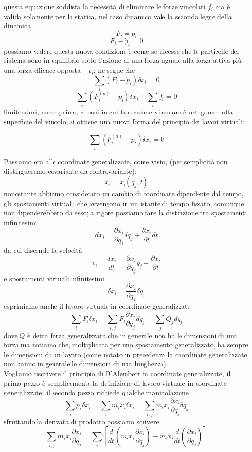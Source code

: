 \documentclass[
10pt, %
a4paper, %
oneside, %
headinclude,footinclude, %
BCOR5mm, %
]{scrartcl}
\begin{document}
questa equazione soddisfa la necessità di eliminare le forze vincolari \(f_i\) ma è valida solamente per la statica, nel caso dinamico vale la seconda legge della dinamica
\[F_i  = \dot{p_i}\]
\[F_i-\dot{p}_i = 0\]
possiamo vedere questa nuova condizione è come se dicesse che le particelle del sistema sono in equilibrio sotto l'azione di una forza uguale alla forza attiva più una forza efficace opposta \(-\dot{p}_i\); ne segue che
\[\sum_i(F_i-\dot{p}_i)\delta x_i = 0\]
\[\sum_i(F^{(a)}_i-\dot{p}_i)\delta x_i + \sum_i f_i = 0\]
limitandoci, come prima, ai casi in cui la reazione vincolare è ortogonale alla superficie del vincolo, si ottiene una nuova forma del principio dei lavori virtuali:
\begin{teorema}
	\[\sum_i(F^{(a)}_i-\dot{p}_i)\delta x_i= 0\]
\end{teorema}
Passiamo ora alle coordinate generalizzate, come visto, (per semplicità non distingueremo covariante da controvariante):
\[ x_i = x_i(q_j, t)\]
nonostante abbiamo considerato un cambio di coordinate dipendente dal tempo, gli spostamenti virtuali, che avvengono in un istante di tempo fissato, comunque non dipenderebbero da esso; a rigore possiamo fare la distinzione tra spostamenti infinitesimi
\[d x_i = \frac{\partial x_i}{\partial q_j}d q_j + \frac{\partial x_i}{\partial t}dt\]
da cui discende la velocità
\[v_i = \frac{dx_i}{dt}= \frac{\partial x_i}{\partial q_j}\dot{q}_j + \frac{\partial x_i}{\partial t}\]
e spostamenti virtuali infinitesimi
\[\delta x_i =  \frac{\partial x_i}{\partial q_j}\delta q_j\]
esprimiamo anche il lavoro virtuale in coordinate generalizzate
\[\sum_i F_i\delta x_i = \sum_{i,j}F_i \frac{\partial x_i}{\partial q_j}d q_j = \sum_j Q_j d q_j\]
dove \(Q\) è detta forza generalizzata che in generale non ha le dimensioni di una forza ma notiamo che, moltiplicata per uno spostamento generalizzato, ha sempre le dimensioni di un lavoro (come notato in precedenza la coordinate generalizzate non hanno in generale le dimensioni di una lunghezza).\\
Vogliamo riscrivere il principio di D'Alembert in coordinate generalizzate, il primo pezzo è semplicemente la definizione di lavoro virtuale in coordinate generalizzate; il secondo pezzo richiede qualche manipolazione
\[\sum_i \dot{p}_i \delta x_i = \sum_i m_i \ddot{x}_i\delta x_i = \sum_{i, j} m_i \ddot{x}_i \frac{\partial x_i}{\partial q_j}\delta q_j\]
sfruttando la derivata di prodotto possiamo scrivere
\[\sum_{i, j} m_i \ddot{x}_i \frac{\partial x_i}{\partial q_j} = \sum_i \left[\frac{d}{dt}\left(m_i\dot{x}_i\frac{\partial x_i}{\partial q_j}\right) - m_i \dot{x}_i\frac{d}{dt}\left(\frac{\partial x_i}{\partial q_j}\right)\right]\]
\end{document}
